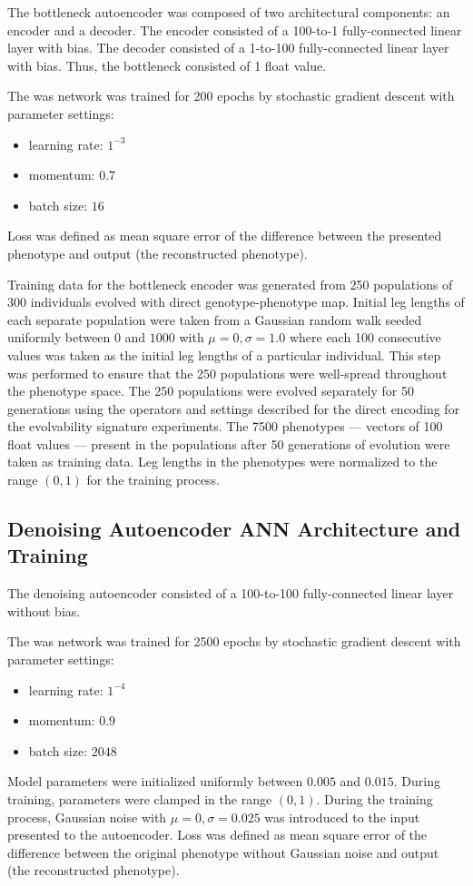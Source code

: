 The bottleneck autoencoder was composed of two architectural components: an encoder and a decoder.
The encoder consisted of a 100-to-1 fully-connected linear layer with bias.
The decoder consisted of a 1-to-100 fully-connected linear layer with bias.
Thus, the bottleneck consisted of 1 float value.

The was network was trained for 200 epochs by stochastic gradient descent with parameter settings:
\begin{itemize}
  \item learning rate: $1^{-3}$
  \item momentum: $0.7$
  \item batch size: $16$
\end{itemize}
Loss was defined as mean square error of the difference between the presented phenotype and output (the reconstructed phenotype).

Training data for the bottleneck encoder was generated from 250 populations of 300 individuals evolved with direct genotype-phenotype map.
Initial leg lengths of each separate population were taken from a Gaussian random walk seeded uniformly between $0$ and $1000$ with $\mu = 0, \sigma = 1.0$ where each 100 consecutive values was taken as the initial leg lengths of a particular individual.
This step was performed to ensure that the 250 populations were well-spread throughout the phenotype space.
The 250 populations were evolved separately for 50 generations using the operators and settings described for the direct encoding for the evolvability signature experiments.
The 7500 phenotypes --- vectors of 100 float values --- present in the populations after 50 generations of evolution were taken as training data.
Leg lengths in the phenotypes were normalized to the range $(0,1)$ for the training process.

\subsection{Denoising Autoencoder ANN Architecture and Training}

The denoising autoencoder consisted of a 100-to-100 fully-connected linear layer without bias.

The was network was trained for 2500 epochs by stochastic gradient descent with parameter settings:
\begin{itemize}
  \item learning rate: $1^{-4}$
  \item momentum: $0.9$
  \item batch size: $2048$
\end{itemize}
Model parameters were initialized uniformly between $0.005$ and $0.015$.
During training, parameters were clamped in the range $(0,1)$.
During the training process, Gaussian noise with $\mu = 0, \sigma = 0.025$ was introduced to the input presented to the autoencoder.
Loss was defined as mean square error of the difference between the original phenotype without Gaussian noise and output (the reconstructed phenotype).

